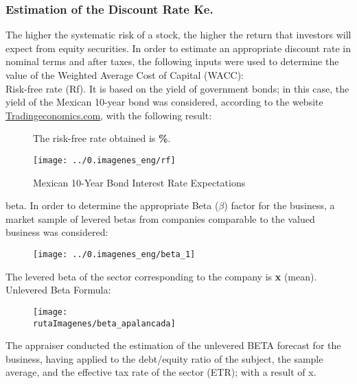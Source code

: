 

\subsubsection{Estimation of the Discount Rate Ke.}

The higher the systematic risk of a stock, the higher the return that investors will expect from equity securities. In order to estimate an appropriate discount rate in nominal terms and after taxes, the following inputs were used to determine the value of the \textcolor{principal}{Weighted Average Cost of Capital (WACC):}\\

\textcolor{principal}{Risk-free rate (Rf).} It is based on the yield of government bonds; in this case, the yield of the Mexican 10-year bond was considered, according to the website \url{Tradingeconomics.com}, with the following result:\\

\begin{figure}[H]
\centering
The risk-free rate obtained is \textbf{\rfValor\%}.\\[5pt]

\caption{Mexican  10-Year Bond Interest Rate Expectations}
 \texttt{[image: ../0.imagenes\_eng/rf]}
\end{figure}


\gls{beta}. In order to determine the appropriate Beta ($\beta$) factor for the business, a market sample of levered betas from companies comparable to the valued business was considered:\\


\begin{figure}[H]
\centering
\texttt{[image: ../0.imagenes\_eng/beta\_1]}\\
\end{figure}

The levered beta of the sector corresponding to the company is \textcolor{principal}{\textbf{\valorBeta x}} (mean).\\

Unlevered Beta Formula:\\

\begin{figure}[H]
\centering
\texttt{[image: \\rutaImagenes/beta\_apalancada]}
\end{figure}


The appraiser conducted the estimation of the unlevered BETA forecast for the business, having applied to the debt/equity ratio of the subject, the sample average, and the effective tax rate of the sector (ETR); with a result of \textcolor{principal}{\betaDesapalancada x}.\\

